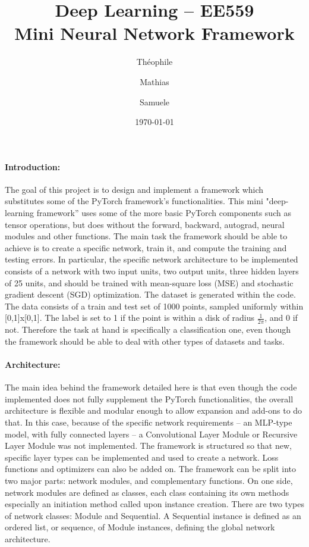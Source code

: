\documentclass[10pt, a4paper]{article}
\begin{document}
\title{\large{\textbf{Deep Learning -- EE559 \\ Mini Neural Network Framework}}}
\date{\normalsize{\today}}
\author{\normalsize{Th\' eophile 	} \and \normalsize{Mathias } \and \normalsize{Samuele }}
\maketitle

\paragraph{Introduction:} The goal of this project is to design and implement a framework which substitutes some of the PyTorch framework's functionalities. This mini "deep-learning framework” uses some of the more basic PyTorch components such as tensor operations, but does without the forward, backward, autograd, neural modules and other functions. 
The main task the framework should be able to achieve is to create a specific network, train it, and compute the training and testing errors.
In particular, the specific network architecture to be implemented consists of a network with two input units, two output units, three hidden layers of 25 units, and should be trained with mean-square loss (MSE) and stochastic gradient descent (SGD) optimization.
The dataset is generated within the code. The data consists of a train and test set of 1000 points, sampled uniformly within [0,1]x[0,1]. The label is set to 1 if the point is within a disk of radius $\frac{1}{2\pi}$, and 0 if not. Therefore the task at hand is specifically a classification one, even though the framework should be able to deal with other types of datasets and tasks.
	
\paragraph{Architecture:}The main idea behind the framework detailed here is that even though the code implemented does not fully supplement the PyTorch functionalities, the overall architecture is flexible and modular enough to allow expansion and add-ons to do that. In this case, because of the specific network requirements -- an MLP-type model, with fully connected layers -- a Convolutional Layer Module or Recursive Layer Module was not implemented. The framework is structured so that new, specific layer types can be implemented and used to create a network. Loss functions and optimizers can also be added on.
The framework can be split into two major parts: network modules, and complementary functions. 
On one side, network modules are defined as classes, each class containing its own methods especially an initiation method called upon instance creation. There are two types of network classes: Module and Sequential. A Sequential instance is defined as an ordered list, or sequence, of Module instances, defining the global network architecture.
\end{document}
